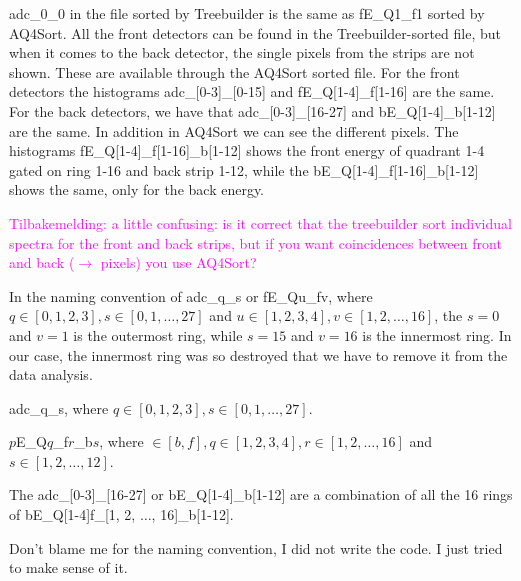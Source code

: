 \documentclass[twoside,english]{uiofysmaster/uiofysmaster}
\begin{document}
adc\_0\_0 in the file sorted by Treebuilder is the same as fE\_Q1\_f1 sorted by AQ4Sort. All the front detectors can be found in the Treebuilder-sorted file, but when it comes to the back detector, the single pixels from the strips are not shown. These are available through the AQ4Sort sorted file. For the front detectors the histograms adc\_[0-3]\_[0-15] and fE\_Q[1-4]\_f[1-16] are the same. For the back detectors, we have that adc\_[0-3]\_[16-27] and bE\_Q[1-4]\_b[1-12] are the same. In addition in AQ4Sort we can see the different pixels. The histograms fE\_Q[1-4]\_f[1-16]\_b[1-12] shows the front energy of quadrant 1-4 gated on ring 1-16 and back strip 1-12, while the bE\_Q[1-4]\_f[1-16]\_b[1-12] shows the same, only for the back energy. 

\textcolor{Magenta}{Tilbakemelding: \newline 
a little confusing: is it correct that the treebuilder sort individual spectra for the front and back strips, but if you want coincidences between front and back ($\rightarrow$ pixels) you use AQ4Sort?
}

In the naming convention of adc\_q\_s or fE\_Qu\_fv, where $q \in [0, 1, 2, 3], s \in [0, 1, \ldots, 27]$ and $u \in [1, 2, 3, 4], v \in [1, 2, \ldots, 16]$, the $s = 0$ and $v = 1$ is the outermost ring, while $s = 15$ and $v = 16$ is the innermost ring. In our case, the innermost ring was so destroyed that we have to remove it from the data analysis.


adc\_q\_s, where $q \in [0, 1, 2, 3], s \in [0, 1, \ldots, 27]$.

$p$E\_Q$q$\_f$r$\_b$s$, where $ \in [b, f], q \in [1, 2, 3, 4], r \in [1, 2, \ldots, 16]$ and $s \in [1, 2, \ldots, 12]$. 

The adc\_[0-3]\_[16-27] or bE\_Q[1-4]\_b[1-12] are a combination of all the 16 rings of bE\_Q[1-4]f\_[1, 2, $\ldots$, 16]\_b[1-12].

Don't blame me for the naming convention, I did not write the code. I just tried to make sense of it.
\end{document}
